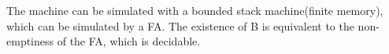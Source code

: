 \documentclass{article}
\begin{document}
\section{}

\section{}

The machine can be simulated with a bounded stack machine(finite memory), which can be simulated by a FA. The existence of B is equivalent to the non-emptiness of the FA, which is decidable.
\end{document}
